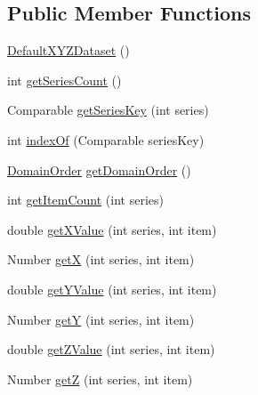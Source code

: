 \subsection*{Public Member Functions}
\begin{DoxyCompactItemize}
\item 
\mbox{\hyperlink{classorg_1_1jfree_1_1data_1_1xy_1_1_default_x_y_z_dataset_a84ab360a508deaa07e3851facef65dde}{Default\+X\+Y\+Z\+Dataset}} ()
\item 
int \mbox{\hyperlink{classorg_1_1jfree_1_1data_1_1xy_1_1_default_x_y_z_dataset_a115138a06afdc19d3526ef73fabf578e}{get\+Series\+Count}} ()
\item 
Comparable \mbox{\hyperlink{classorg_1_1jfree_1_1data_1_1xy_1_1_default_x_y_z_dataset_a836fc96c5df3cb865401db79238daa7a}{get\+Series\+Key}} (int series)
\item 
int \mbox{\hyperlink{classorg_1_1jfree_1_1data_1_1xy_1_1_default_x_y_z_dataset_a101e4548925084c18e0c2952ac13206f}{index\+Of}} (Comparable series\+Key)
\item 
\mbox{\hyperlink{classorg_1_1jfree_1_1data_1_1_domain_order}{Domain\+Order}} \mbox{\hyperlink{classorg_1_1jfree_1_1data_1_1xy_1_1_default_x_y_z_dataset_a9e4e89eafc3996ec5c9fd10f6d3891a4}{get\+Domain\+Order}} ()
\item 
int \mbox{\hyperlink{classorg_1_1jfree_1_1data_1_1xy_1_1_default_x_y_z_dataset_ab2b89b3c08d589c6d554ad4656be1dd2}{get\+Item\+Count}} (int series)
\item 
double \mbox{\hyperlink{classorg_1_1jfree_1_1data_1_1xy_1_1_default_x_y_z_dataset_a595c9b15046e75687ad4cc5f7b6a4617}{get\+X\+Value}} (int series, int item)
\item 
Number \mbox{\hyperlink{classorg_1_1jfree_1_1data_1_1xy_1_1_default_x_y_z_dataset_a46a17db4f8c6013a1ff779529478c221}{getX}} (int series, int item)
\item 
double \mbox{\hyperlink{classorg_1_1jfree_1_1data_1_1xy_1_1_default_x_y_z_dataset_a1d085e3b2a18c6af96b15fd78d4ae9e8}{get\+Y\+Value}} (int series, int item)
\item 
Number \mbox{\hyperlink{classorg_1_1jfree_1_1data_1_1xy_1_1_default_x_y_z_dataset_adcfdc1d2da9d58dae9cd6d2a006be1af}{getY}} (int series, int item)
\item 
double \mbox{\hyperlink{classorg_1_1jfree_1_1data_1_1xy_1_1_default_x_y_z_dataset_a629e54a55e3affb5ff0e1151df651068}{get\+Z\+Value}} (int series, int item)
\item 
Number \mbox{\hyperlink{classorg_1_1jfree_1_1data_1_1xy_1_1_default_x_y_z_dataset_a9d64059ab691a5d4e2de1ba1e70bb02e}{getZ}} (int series, int item)

\end{DoxyCompactItemize}
